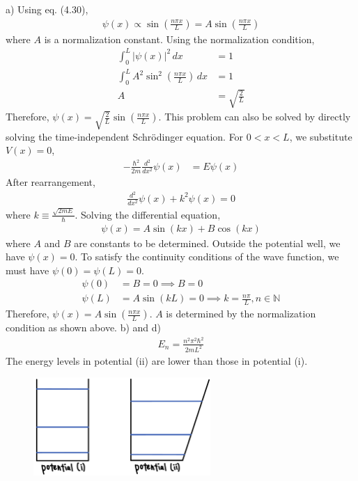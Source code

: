 \documentclass[12pt]{book} %
\numberwithin{equation}{chapter}
\def\N{\mathbb{N}}
\begin{document}
\begin{solbox}
a) Using eq. (4.30),
\begin{align*}
\psi(x)\propto\sin\left(\frac{n\pi x}{L}\right)=A\sin\left(\frac{n\pi x}{L}\right)
\end{align*}
where $A$ is a normalization constant. Using the normalization condition,
\begin{align*}
\int_{0}^{L}{\left|\psi(x)\right|}^{2}\,dx&=1\\
\int_{0}^{L}A^{2}\sin^{2}\left(\frac{n\pi x}{L}\right)\,dx&=1\\
A&=\sqrt{\frac{2}{L}}
\end{align*}
Therefore, $\psi(x)=\sqrt{\frac{2}{L}}\sin\left(\frac{n\pi x}{L}\right)$.\bigskip\newline
This problem can also be solved by directly solving the time-independent Schr\"{o}dinger equation. For $0<x<L$, we substitute $V(x)=0$,
\begin{align*}
-\frac{\hbar^{2}}{2m}\frac{d^{2}}{dx^{2}}\psi(x)&=E\psi(x)
\end{align*}
After rearrangement,
\begin{align*}
\frac{d^{2}}{dx^{2}}\psi(x)+k^{2}\psi(x)=0
\end{align*}
where $k\equiv\frac{\sqrt{2mE}}{\hbar}$. Solving the differential equation,
\begin{align*}
\psi(x)=A\sin(kx)+B\cos(kx)
\end{align*}
where $A$ and $B$ are constants to be determined. Outside the potential well, we have $\psi(x)=0$. To satisfy the continuity conditions of the wave function, we must have $\psi(0)=\psi(L)=0$. 
\begin{align*}
\psi(0)&=B=0\implies B=0\\
\psi(L)&=A\sin(kL)=0\implies k=\frac{n\pi}{L}, n\in\N
\end{align*}
Therefore, $\psi(x)=A\sin\left(\frac{n\pi x}{L}\right)$. $A$ is determined by the normalization condition as shown above.\bigskip\newline
b) and d)
\begin{align*}
E_{n}=\frac{n^{2}\pi^{2}\hbar^{2}}{2mL^{2}}
\end{align*}
The energy levels in potential (ii) are lower than those in potential (i).
\begin{figure}[H]
\centering
\includegraphics[width=0.6\textwidth]{Infinite potential well energy levels}

\end{figure}
\end{solbox}
\end{document}

